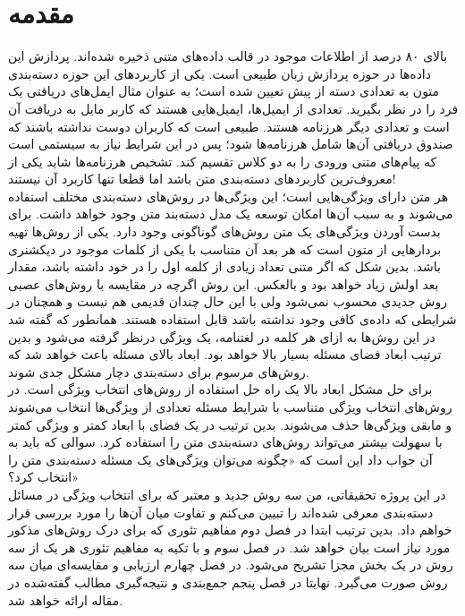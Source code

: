 \chapter{مقدمه}
بالای ۸۰ درصد از اطلاعات موجود در قالب داده‌های متنی ذخیره شده‌اند\cite{ghareb2016hybrid}. پردازش این داده‌ها در حوزه پردازش زبان طبیعی است. یکی از کاربردهای این حوزه دسته‌بندی متون به تعدادی دسته از پیش تعیین شده است؛ به عنوان مثال ایمل‌های دریافتی یک فرد را در نظر بگیرید. تعدادی از ایمیل‌ها، ایمیل‌هایی هستند که کاربر مایل به دریافت آن است و تعدادی دیگر هرزنامه هستند. طبیعی است که کاربران دوست نداشته باشند که صندوق دریافتی آن‌ها شامل هرزنامه‌ها شود؛ پس در این شرایط نیاز به سیستمی است که پیام‌های متنی ورودی را به دو کلاس تقسیم کند. تشخیص هرزنامه‌ها شاید یکی از معروف‌ترین کاربرد‌های دسته‌بندی متن باشد اما قطعا تنها کاربرد آن نیستند!
\\

هر متن دارای ویژگی‌هایی است؛ این ویژگی‌ها در روش‌های دسته‌بندی مختلف استفاده می‌شوند و به سبب آن‌ها امکان توسعه یک مدل دسته‌بند متن وجود خواهد داشت. برای بدست آوردن ویژگی‌های یک متن روش‌های گوناگونی وجود دارد. یکی از روش‌ها تهیه بردارهایی از متون است که هر بعد آن متناسب با یکی از کلمات موجود در دیکشنری باشد. بدین شکل که اگر متنی تعداد زیادی از کلمه اول را در خود داشته باشد، مقدار بعد اولش زیاد خواهد بود و بالعکس. این روش اگرچه در مقایسه با روش‌های عصبی روش جدیدی محسوب نمی‌شود ولی با این حال چندان قدیمی هم نیست و همچنان در شرایطی که داده‌‌ی کافی وجود نداشته باشد قابل استفاده هستند. همانطور که گفته شد در این روش‌ها به ازای هر کلمه در لغتنامه، یک ویژگی درنظر گرفته می‌شود و بدین ترتیب ابعاد فضای مسئله بسیار بالا خواهد بود. ابعاد بالای مسئله باعث خواهد شد که روش‌های مرسوم برای دسته‌بندی دچار مشکل جدی شوند.
\\

برای حل مشکل ابعاد بالا یک راه حل استفاده از روش‌های انتخاب ویژگی است. در روش‌های انتخاب ویژگی متناسب با شرایط مسئله تعدادی از ویژگی‌ها انتخاب می‌شوند و مابقی ویژگی‌ها حذف می‌شوند. بدین ترتیب در یک فضای با ابعاد کمتر و ویژگی کمتر با سهولت بیشتر می‌تواند روش‌های دسته‌بندی متن را استفاده کرد. سوالی که باید به آن جواب داد این است که «چگونه می‌توان ویژگی‌های یک مسئله دسته‌بندی متن را انتخاب کرد؟»
\\

در این پروژه تحقیقاتی، من سه روش جدید و معتبر \cite{uysal2016improved} \cite{labani2018novel} \cite{ghareb2016hybrid}که برای انتخاب ویژگی در مسائل دسته‌بندی معرفی شده‌اند را تبیین می‌کنم و تفاوت میان آن‌ها را مورد بررسی قرار خواهم داد. بدین ترتیب ابتدا در فصل دوم مفاهیم تئوری که برای درک روش‌های مذکور مورد نیاز است بیان خواهد شد. در فصل سوم و با تکیه به مفاهیم تئوری هر یک از سه روش در یک بخش مجزا تشریح می‌شود. در فصل چهارم ارزیابی و مقایسه‌ای میان سه روش صورت می‌گیرد. نهایتا در فصل پنجم جمع‌بندی و نتیجه‌گیری مطالب گفته‌شده در مقاله ارائه خواهد شد. 